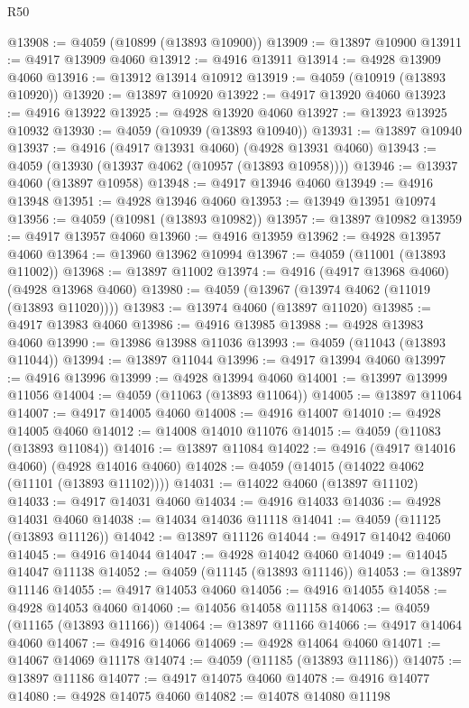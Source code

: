 \begin{lexlean}{R50}
\begin{coremodule}
@13908 := @4059 (@10899 (@13893 @10900))
@13909 := @13897 @10900
@13911 := @4917 @13909 @4060
@13912 := @4916 @13911
@13914 := @4928 @13909 @4060
@13916 := @13912 @13914 @10912
@13919 := @4059 (@10919 (@13893 @10920))
@13920 := @13897 @10920
@13922 := @4917 @13920 @4060
@13923 := @4916 @13922
@13925 := @4928 @13920 @4060
@13927 := @13923 @13925 @10932
@13930 := @4059 (@10939 (@13893 @10940))
@13931 := @13897 @10940
@13937 := @4916 (@4917 @13931 @4060) (@4928 @13931 @4060)
@13943 := @4059 (@13930 (@13937 @4062 (@10957 (@13893 @10958))))
@13946 := @13937 @4060 (@13897 @10958)
@13948 := @4917 @13946 @4060
@13949 := @4916 @13948
@13951 := @4928 @13946 @4060
@13953 := @13949 @13951 @10974
@13956 := @4059 (@10981 (@13893 @10982))
@13957 := @13897 @10982
@13959 := @4917 @13957 @4060
@13960 := @4916 @13959
@13962 := @4928 @13957 @4060
@13964 := @13960 @13962 @10994
@13967 := @4059 (@11001 (@13893 @11002))
@13968 := @13897 @11002
@13974 := @4916 (@4917 @13968 @4060) (@4928 @13968 @4060)
@13980 := @4059 (@13967 (@13974 @4062 (@11019 (@13893 @11020))))
@13983 := @13974 @4060 (@13897 @11020)
@13985 := @4917 @13983 @4060
@13986 := @4916 @13985
@13988 := @4928 @13983 @4060
@13990 := @13986 @13988 @11036
@13993 := @4059 (@11043 (@13893 @11044))
@13994 := @13897 @11044
@13996 := @4917 @13994 @4060
@13997 := @4916 @13996
@13999 := @4928 @13994 @4060
@14001 := @13997 @13999 @11056
@14004 := @4059 (@11063 (@13893 @11064))
@14005 := @13897 @11064
@14007 := @4917 @14005 @4060
@14008 := @4916 @14007
@14010 := @4928 @14005 @4060
@14012 := @14008 @14010 @11076
@14015 := @4059 (@11083 (@13893 @11084))
@14016 := @13897 @11084
@14022 := @4916 (@4917 @14016 @4060) (@4928 @14016 @4060)
@14028 := @4059 (@14015 (@14022 @4062 (@11101 (@13893 @11102))))
@14031 := @14022 @4060 (@13897 @11102)
@14033 := @4917 @14031 @4060
@14034 := @4916 @14033
@14036 := @4928 @14031 @4060
@14038 := @14034 @14036 @11118
@14041 := @4059 (@11125 (@13893 @11126))
@14042 := @13897 @11126
@14044 := @4917 @14042 @4060
@14045 := @4916 @14044
@14047 := @4928 @14042 @4060
@14049 := @14045 @14047 @11138
@14052 := @4059 (@11145 (@13893 @11146))
@14053 := @13897 @11146
@14055 := @4917 @14053 @4060
@14056 := @4916 @14055
@14058 := @4928 @14053 @4060
@14060 := @14056 @14058 @11158
@14063 := @4059 (@11165 (@13893 @11166))
@14064 := @13897 @11166
@14066 := @4917 @14064 @4060
@14067 := @4916 @14066
@14069 := @4928 @14064 @4060
@14071 := @14067 @14069 @11178
@14074 := @4059 (@11185 (@13893 @11186))
@14075 := @13897 @11186
@14077 := @4917 @14075 @4060
@14078 := @4916 @14077
@14080 := @4928 @14075 @4060
@14082 := @14078 @14080 @11198

\end{coremodule}
\end{lexlean}
